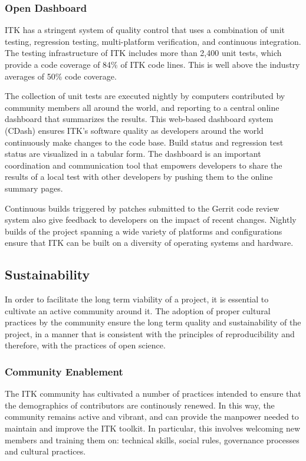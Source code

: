 \documentclass{frontiersENG} %
\begin{document}
\subsubsection{Open Dashboard} ITK has a stringent system of quality control
that uses a combination of unit testing, regression testing, multi-platform
verification, and continuous integration. The testing infrastructure of ITK
includes more than 2,400 unit tests, which provide a code coverage of 84\% of
ITK code lines. This is well above the industry averages of 50\% code coverage.

The collection of unit tests are executed nightly by computers contributed by
community members all around the world, and reporting to a central online
dashboard that summarizes the results. This web-based dashboard system (CDash)
 \cite{ITKDashboard} ensures ITK’s software quality as developers around the
world continuously make changes to the code base. Build status and regression
test status are visualized in a tabular form. The dashboard is an important
coordination and communication tool that empowers developers to share the
results of a local test with other developers by pushing them to the online
summary pages.

Continuous builds triggered by patches submitted to the Gerrit code review
system also give feedback to developers on the impact of recent changes.
Nightly builds of the project spanning a wide variety of platforms and
configurations ensure that ITK can be built on a diversity of operating systems
and hardware.



\subsection{Sustainability}

In order to facilitate the long term viability of a project, it is essential to
cultivate an active community around it. The adoption of proper cultural
practices by the community ensure the long term quality and sustainability of
the project, in a manner that is consistent with the principles of
reproducibility and therefore, with the practices of open science.

\subsubsection{Community Enablement}

The ITK community has cultivated a number of practices intended to ensure that
the demographics of contributors are continously renewed. In this way, the
community remains active and vibrant, and can provide the manpower needed to
maintain and improve the ITK toolkit. In particular, this involves welcoming
new members and training them on:  technical skills, social rules, governance
processes and cultural practices.
\end{document}
